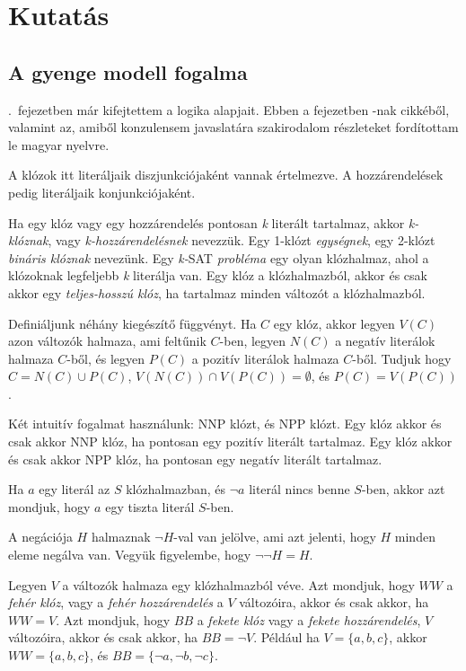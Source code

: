 \documentclass[
]{thesis-ekf}
\theoremstyle{definition}
\theoremstyle{remark}
\begin{document}
\chapter{Kutatás}
	\section{A gyenge modell fogalma}\label{sec-szakirodalom-forditas}
	
	\Az{\ref{sec-alap-fogalmak}}.~fejezetben már kifejtettem a logika alapjait. Ebben a fejezetben -nak cikkéből, valamint  az, amiből konzulensem javaslatára szakirodalom részleteket fordítottam le magyar nyelvre.
	
	\label{ssec-fogalmak}
	
	A klózok itt literáljaik diszjunkciójaként vannak értelmezve. A hozzárendelések pedig literáljaik konjunkciójaként.
	
	Ha egy klóz vagy egy hozzárendelés pontosan \emph{k} literált tartalmaz, akkor \emph{k-klóznak}, vagy \emph{k-hozzárendelésnek} nevezzük. Egy 1-klózt \emph{egységnek}, egy 2-klózt \emph{bináris klóznak} nevezünk. Egy \emph{k-}\textsc{SAT} \emph{probléma} egy olyan klózhalmaz, ahol a klózoknak legfeljebb \emph{k} literálja van. Egy klóz a klózhalmazból, akkor és csak akkor egy \emph{teljes-hosszú klóz}, ha tartalmaz minden változót a klózhalmazból.
	
	Definiáljunk néhány kiegészítő függvényt. Ha $ C $ egy klóz, akkor legyen $ V(C) $ azon változók halmaza, ami feltűnik $ C $-ben, legyen $ N(C) $ a negatív literálok halmaza $ C $-ből, és legyen $ P(C) $ a pozitív literálok halmaza $ C $-ből. Tudjuk hogy $ C=N(C)\cup P(C)$, $V(N(C))\cap V(P(C))=\emptyset $, és $ P(C)=V(P(C)) $.
	
	Két intuitív fogalmat használunk: \textsc{NNP} klózt, és \textsc{NPP} klózt. Egy klóz akkor és csak akkor \textsc{NNP} klóz, ha pontosan egy pozitív literált tartalmaz. Egy klóz akkor és csak akkor \textsc{NPP} klóz, ha pontosan egy negatív literált tartalmaz.
	
	Ha $ a $ egy literál az $ S $ klózhalmazban, és $ \neg a $ literál nincs benne $ S $-ben, akkor azt mondjuk, hogy $ a $ egy tiszta literál $ S $-ben.
	
	A negációja $ H $ halmaznak $ \neg H $-val van jelölve, ami azt jelenti, hogy $ H $ minden eleme negálva van. Vegyük figyelembe, hogy $ \neg\neg H=H $.

	Legyen $ V $ a változók halmaza egy klózhalmazból véve. Azt mondjuk, hogy $ WW $ a \emph{fehér klóz}, vagy a \emph{fehér hozzárendelés} a $ V $ változóira, akkor és csak akkor, ha $ WW=V $. Azt mondjuk, hogy $ BB $ a \emph{fekete klóz} vagy a \emph{fekete hozzárendelés}, $ V $ változóira, akkor és csak akkor, ha $ BB =\neg V$. Például ha $ V=\{a,b,c\} $, akkor $ WW=\{a,b,c\} $, és $ BB=\{\neg a,\neg b,\neg c\} $.
	
\end{document}
